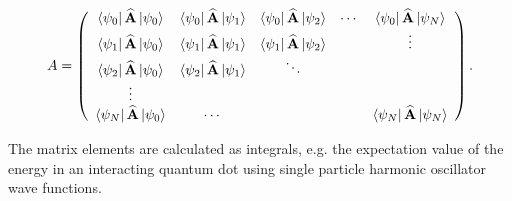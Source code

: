 \begin{equation}
A = \left( 
\begin{array}{ccccc}
\left< \psi_0 \right| {\bf\widehat{A}} \left| \psi_0 \right>  &  \left< \psi_0 \right| {\bf\widehat{A}} \left| \psi_1 \right> & \left< \psi_0 \right| {\bf\widehat{A}} \left| \psi_2 \right> & \cdots &  \left< \psi_0 \right| {\bf\widehat{A}} \left| \psi_N \right>\\
\left< \psi_1 \right| {\bf\widehat{A}} \left| \psi_0 \right>  &  \left< \psi_1 \right| {\bf\widehat{A}} \left| \psi_1 \right> & \left< \psi_1 \right| {\bf\widehat{A}} \left| \psi_2 \right> &        &  \vdots                          \\
\left< \psi_2 \right| {\bf\widehat{A}} \left| \psi_0 \right>  &  \left< \psi_2 \right| {\bf\widehat{A}} \left| \psi_1 \right> & \ddots                           &        &                                  \\
\vdots                            &                                   &                                  &        &                                  \\
\left< \psi_N \right| {\bf\widehat{A}} \left| \psi_0 \right>  &  \cdots                           &                                  &        &  \left< \psi_N \right| {\bf\widehat{A}} \left| \psi_N \right>\\
\end{array} \right).
\end{equation}

The matrix elements are calculated as integrals, e.g. the expectation value of the energy in an interacting quantum dot using single particle harmonic oscillator wave functions.

